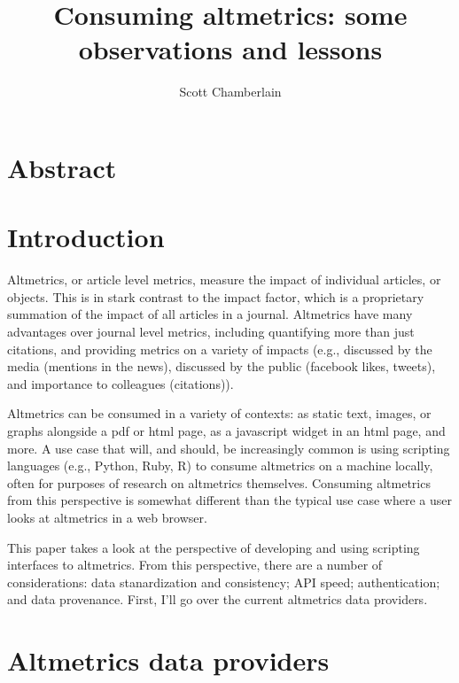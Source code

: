 \documentclass[letterpaper,superscriptaddress,showkeys,longbibliography]{revtex4-1}
\begin{document}

\title{Consuming altmetrics: some observations and lessons}

\author{Scott Chamberlain}


\maketitle

\section{Abstract}

\section{Introduction}

Altmetrics, or article level metrics, measure the impact of individual articles, or objects. This is in stark contrast to the impact factor, which is a proprietary summation of the impact of all articles in a journal. Altmetrics have many advantages over journal level metrics, including quantifying more than just citations, and providing metrics on a variety of impacts (e.g., discussed by the media (mentions in the news), discussed by the public (facebook likes, tweets), and importance to colleagues (citations)). 

Altmetrics can be consumed in a variety of contexts: as static text, images, or graphs alongside a pdf or html page, as a javascript widget in an html page, and more. A use case that will, and should, be increasingly common is using scripting languages (e.g., Python, Ruby, R) to consume altmetrics on a machine locally, often for purposes of research on altmetrics themselves. Consuming altmetrics from this perspective is somewhat different than the typical use case where a user looks at altmetrics in a web browser. 

This paper takes a look at the perspective of developing and using scripting interfaces to altmetrics. From this perspective, there are a number of considerations: data stanardization and consistency; API speed; authentication; and data provenance. First, I'll go over the current altmetrics data providers. 

\section{Altmetrics data providers}
\end{document}
